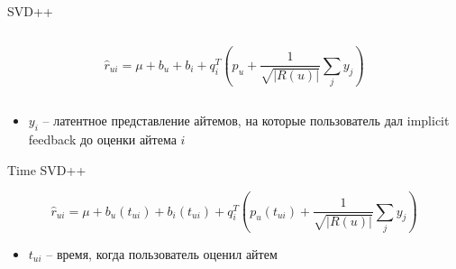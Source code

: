 \documentclass[11pt,aspectratio=169,handout=true]{beamer}
\begin{document}
\begin{frame}{SVD++}

\begin{columns}
\begin{column}{0.1\textwidth} 
\end{column}
\begin{column}{0.7\textwidth} 
\begin{tcolorbox}[colback=info!5,colframe=info!80,title=Модель]
\[
\hat r_{ui} = \mu + b_u + b_i + q_i^T \left( p_u + \frac{1}{\sqrt{|R(u)|}} \sum_j y_j \right)
\]
\end{tcolorbox}
\end{column}
\begin{column}{0.1\textwidth} 
\end{column}
\end{columns}

\vfill

\begin{itemize}
\item $y_i$ -- латентное представление айтемов, на которые пользователь дал implicit feedback до оценки айтема $i$
\end{itemize}

\end{frame}

\begin{frame}{Time SVD++}

\begin{tcolorbox}[colback=info!5,colframe=info!80,title=Модель]
\[
\hat r_{ui} = \mu + b_u(t_{ui}) + b_i(t_{ui}) + q_i^T \left( p_u(t_{ui}) + \frac{1}{\sqrt{|R(u)|}} \sum_j y_j \right)
\]
\end{tcolorbox}

\vfill

\begin{itemize}
\item $t_{ui}$ -- время, когда пользователь оценил айтем
\end{itemize}

\end{frame}
\end{document}
